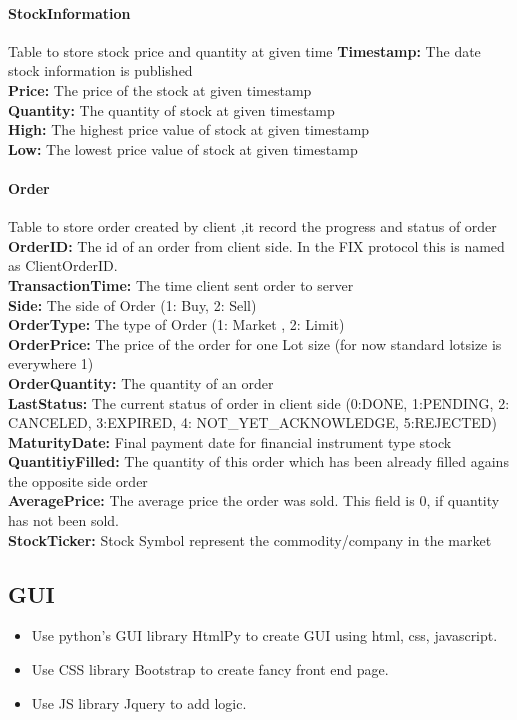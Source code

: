\documentclass[a4paper, 11pt]{article}
\begin{document}
\paragraph*{StockInformation}
Table to store stock price and quantity at given time
\textbf{Timestamp:} The date stock information is published
\\
\textbf{Price:} The price of the stock at given timestamp 
\\
\textbf{Quantity:} The quantity of stock at given timestamp 
\\
\textbf{High:} The highest price value of stock at given timestamp
\\
\textbf{Low:} The lowest price value of stock at given timestamp

\paragraph*{Order}
Table to store order created by client ,it record the progress and status of order
 \\
\textbf{OrderID:} The id of an order from client side. In the FIX protocol this is named as ClientOrderID.
 \\
\textbf{TransactionTime:} The time client sent order to server 
 \\
\textbf{Side:} The side of Order (1: Buy, 2: Sell)
 \\
\textbf{OrderType:} The type of Order (1: Market , 2: Limit)
 \\
\textbf{OrderPrice:} The price of the order for one Lot size (for now standard lotsize is everywhere 1)
 \\
\textbf{OrderQuantity:} The quantity of an order
 \\
\textbf{LastStatus:} The current status of order in client side (0:DONE, 1:PENDING, 2: CANCELED, 3:EXPIRED, 4: NOT\_YET\_ACKNOWLEDGE, 5:REJECTED)
 \\
\textbf{MaturityDate:} Final payment date for financial instrument type stock
 \\
\textbf{QuantitiyFilled:} The quantity of this order which has been already filled agains the opposite side order
 \\
\textbf{AveragePrice:} The average price the order was sold. This field is 0, if quantity has  not been sold.
 \\
\textbf{StockTicker:}  Stock Symbol represent the commodity/company in the market
 

\subsection*{GUI}
\begin{itemize}
  \item Use python's GUI library HtmlPy to create GUI using html, css, javascript.
  \item Use CSS library Bootstrap to create fancy front end page. 
  \item Use JS library Jquery to add logic.
\end{itemize}
\end{document}
